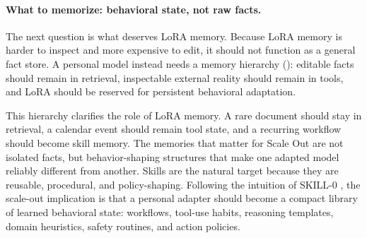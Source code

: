 \paragraph{What to memorize: behavioral state, not raw facts.}
The next question is what deserves LoRA memory. Because LoRA memory is harder to inspect and more expensive to edit, it should not function as a general fact store. A personal model instead needs a memory hierarchy (): editable facts should remain in retrieval, inspectable external reality should remain in tools, and LoRA should be reserved for persistent behavioral adaptation.

\begin{table}[tbp]
\centering
\small
\setlength{\tabcolsep}{6pt}
\renewcommand{\arraystretch}{1.20}
\caption{A practical personal model should decide which memory layer should store each kind of state.}
\label{tab:memory-hierarchy}
\end{table}

This hierarchy clarifies the role of LoRA memory. A rare document should stay in retrieval, a calendar event should remain tool state, and a recurring workflow should become skill memory. The memories that matter for Scale Out are not isolated facts, but behavior-shaping structures that make one adapted model reliably different from another. Skills are the natural target because they are reusable, procedural, and policy-shaping. Following the intuition of SKILL-0 \citep{skill02026}, the scale-out implication is that a personal adapter should become a compact library of learned behavioral state: workflows, tool-use habits, reasoning templates, domain heuristics, safety routines, and action policies.

